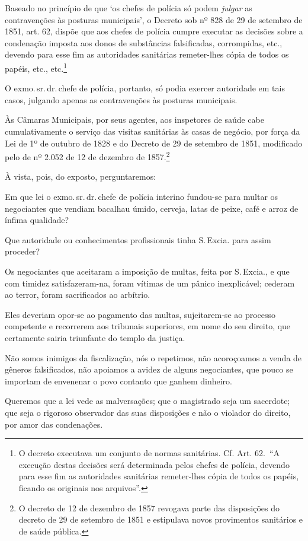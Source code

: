Baseado no princípio de que `os chefes de polícia só podem \emph{julgar}
as contravenções às posturas municipais', o Decreto sob nº 828 de 29 de
setembro de 1851, art. 62, dispõe que aos chefes de polícia cumpre
executar as decisões sobre a condenação imposta aos donos de substâncias
falsificadas, corrompidas, etc., devendo para esse fim as autoridades
sanitárias remeter-lhes cópia de todos os papéis, etc., etc.\footnote{
  O decreto executava um conjunto de normas sanitárias. Cf. Art. 62.~``A
  execução destas decisões será determinada pelos chefes de polícia,
  devendo para esse fim as autoridades sanitárias remeter-lhes cópia de
  todos os papéis, ficando os originais nos arquivos''.}

O exmo.\,sr.\,dr.\,chefe de polícia, portanto, só podia exercer autoridade
em tais casos, julgando apenas as contravenções às posturas municipais.

Às Câmaras Municipais, por seus agentes, aos inspetores de saúde cabe
cumulativamente o serviço das visitas sanitárias às casas de negócio,
por força da Lei de 1º de outubro de 1828 e do Decreto de 29 de setembro
de 1851, modificado pelo de nº 2.052 de 12 de dezembro de
1857.\footnote{O decreto de 12 de dezembro de 1857 revogava parte das disposições
  do decreto de 29 de setembro de 1851 e estipulava novos provimentos sanitários e
  de saúde pública.}

À vista, pois, do exposto, perguntaremos:

Em que lei o exmo.\,sr.\,dr.\,chefe de polícia interino fundou-se para
multar os negociantes que vendiam bacalhau úmido, cerveja, latas de
peixe, café e arroz de ínfima qualidade?

Que autoridade ou conhecimentos profissionais tinha S.\,Excia. para assim
proceder?

Os negociantes que aceitaram a imposição de multas, feita por S.\,Excia.,
e que com timidez satisfazeram-na, foram vítimas de um pânico
inexplicável; cederam ao terror, foram sacrificados ao arbítrio.

Eles deveriam opor-se ao pagamento das multas, sujeitarem-se ao processo
competente e recorrerem aos tribunais superiores, em nome do seu
direito, que certamente sairia triunfante do templo da justiça.

Não somos inimigos da fiscalização, nós o repetimos, não acoroçoamos a
venda de gêneros falsificados, não apoiamos a avidez de alguns
negociantes, que pouco se importam de envenenar o povo contanto que
ganhem dinheiro.

Queremos que a lei vede as malversações; que o magistrado seja um
sacerdote; que seja o rigoroso observador das suas disposições e não o
violador do direito, por amor das condenações.

